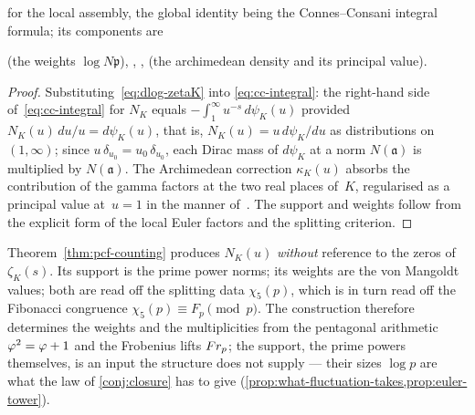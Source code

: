 for the local assembly, the global identity being the Connes--Consani integral formula; its components are

(the weights $\log N\mathfrak p$), , ,  (the archimedean density and its principal value).

\begin{proof}
Substituting~\eqref{eq:dlog-zetaK} into
\eqref{eq:cc-integral}: the
right-hand side of~\eqref{eq:cc-integral} for $N_K$ equals
$-\int_1^\infty u^{-s}\,d\psi_K(u)$ provided
$N_K(u)\,du/u = d\psi_K(u)$, that is,
$N_K(u) = u\,d\psi_K/du$ as distributions on $(1,\infty)$; since
$u\,\delta_{u_0}=u_0\,\delta_{u_0}$, each Dirac mass of $d\psi_K$ at a norm $N(\mathfrak a)$
is multiplied by $N(\mathfrak a)$.  The Archimedean correction $\kappa_K(u)$
absorbs the contribution of the gamma factors at the two real
places of~$K$, regularised as a principal value at~$u=1$ in the manner of~\cite[Eq.~(12) and the definition of $\kappa$ that follows it]{connesconsani10}.
The support and weights follow from the explicit form of the
local Euler factors and the splitting criterion.
\end{proof}

\begin{remark}\label{rmk:counting-structural}
Theorem~\ref{thm:pcf-counting} produces $N_K(u)$ \emph{without}
reference to the zeros of~$\zeta_K(s)$.  Its support is the prime
power norms; its weights are the von Mangoldt values; both are
read off the splitting data $\chi_5(p)$, which is in turn read
off the Fibonacci congruence $\chi_5(p)\equiv F_p\pmod p$.  The
construction therefore determines the weights and the multiplicities from the pentagonal arithmetic
$\varphi^2=\varphi+1$ and the Frobenius lifts $Fr_p$; the support, the prime powers themselves,
is an input the structure does not supply --- their sizes $\log p$ are what the law of
\cref{conj:closure} has to give (\cref{prop:what-fluctuation-takes,prop:euler-tower}).
\end{remark}

